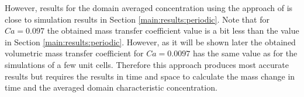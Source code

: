 \documentclass{article}
\begin{document}
However, results for the domain averaged concentration using the approach of \citeauthor{vanbaten-circular} is close to simulation results in Section
\ref{main:results:periodic}. %
Note that for $Ca=0.097$ the
obtained mass transfer coefficient value is a bit less than the value in Section \ref{main:results:periodic}. However, as
it will be shown later the obtained volumetric mass transfer coefficient for $Ca=0.0097$ has the
same value as for the simulations of a few unit cells. Therefore this approach produces most accurate results but requires the results in time and space to calculate the mass change in time and the averaged domain characteristic concentration.
\end{document}
